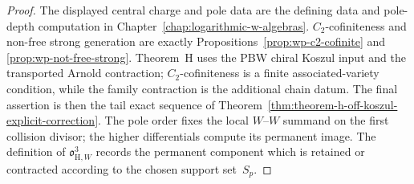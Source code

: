 \begin{proof}
The displayed central charge and pole data are the defining data and
pole-depth computation in Chapter~\ref{chap:logarithmic-w-algebras}.
$C_2$-cofiniteness and non-free strong generation are exactly
Propositions~\ref{prop:wp-c2-cofinite} and
\ref{prop:wp-not-free-strong}. Theorem~H uses the PBW chiral Koszul
input and the transported Arnold contraction; $C_2$-cofiniteness is a
finite associated-variety condition, while the family contraction is
the additional chain datum. The final assertion is then the tail exact
sequence of Theorem~\ref{thm:theorem-h-off-koszul-explicit-correction}.
The pole order fixes the local $W$--$W$ summand on the first collision
divisor; the higher differentials compute its permanent image. The definition
of $\mathfrak{o}_{\mathrm H,W}^{3}$ records the permanent component
which is retained or contracted according to the chosen support
set~$S_p$.
\end{proof}

